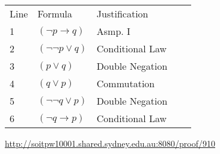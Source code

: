 \documentclass{standalone}
\begin{document}
\begin{tabular}{lllll}
    Line & Formula & Justification \\
    1 & $(\neg p\rightarrow q)$  & Asmp. I \\
    2 & $(\neg \neg p\lor q)$  & Conditional Law \\
    3 & $(p\lor q)$  & Double Negation \\
    4 & $(q\lor p)$  & Commutation \\
    5 & $(\neg \neg q\lor p)$  & Double Negation \\
    6 & $(\neg q\rightarrow p)$  & Conditional Law \\
\end{tabular}

\url{http://soitpw10001.shared.sydney.edu.au:8080/proof/910}
\end{document}
